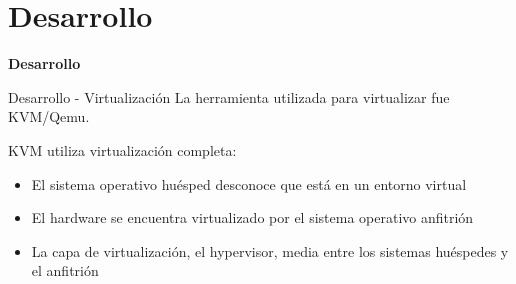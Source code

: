 \section{Desarrollo}
\begin{frame}
    \Huge
    \centering
    \textbf{Desarrollo}

\end{frame}


\begin{frame}{Desarrollo - Virtualización}
    \vspace{-1.5cm}
    La herramienta utilizada para virtualizar fue KVM/Qemu.

    KVM utiliza virtualización completa:
    \begin{itemize}
        \item El sistema operativo huésped desconoce que está en un entorno virtual
        \item El hardware se encuentra virtualizado por el sistema operativo anfitrión
        \item La capa de virtualización, el hypervisor, media entre los sistemas huéspedes y el anfitrión
    \end{itemize}

\end{frame}

